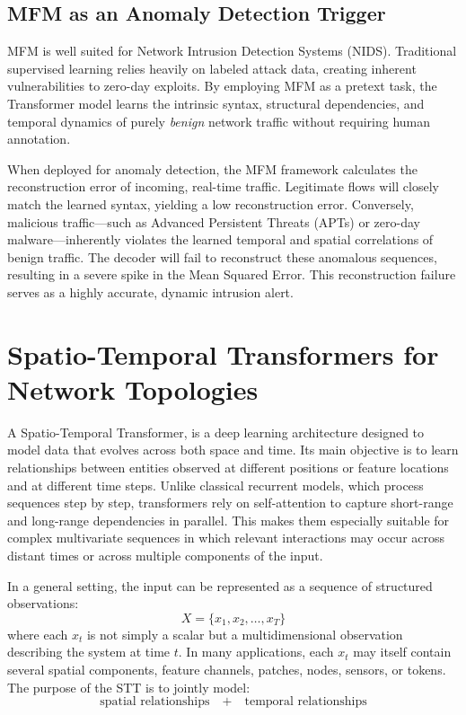 \documentclass[12pt, a4paper]{report}
\begin{document}
\subsection{MFM as an Anomaly Detection Trigger}
MFM is well suited for Network Intrusion Detection Systems (NIDS). Traditional supervised learning relies heavily on labeled attack data, creating inherent vulnerabilities to zero-day exploits. By employing MFM as a pretext task, the Transformer model learns the intrinsic syntax, structural dependencies, and temporal dynamics of purely \textit{benign} network traffic without requiring human annotation.

When deployed for anomaly detection, the MFM framework calculates the reconstruction error of incoming, real-time traffic. Legitimate flows will closely match the learned syntax, yielding a low reconstruction error. Conversely, malicious traffic—such as Advanced Persistent Threats (APTs) or zero-day malware—inherently violates the learned temporal and spatial correlations of benign traffic. The decoder will fail to reconstruct these anomalous sequences, resulting in a severe spike in the Mean Squared Error. This reconstruction failure serves as a highly accurate, dynamic intrusion alert.


\section{Spatio-Temporal Transformers for Network Topologies}


A Spatio-Temporal Transformer, is a deep learning architecture designed to model data that evolves across both space and time. Its main objective is to learn relationships between entities observed at different positions or feature locations and at different time steps. Unlike classical recurrent models, which process sequences step by step, transformers rely on self-attention to capture short-range and long-range dependencies in parallel. This makes them especially suitable for complex multivariate sequences in which relevant interactions may occur across distant times or across multiple components of the input.

In a general setting, the input can be represented as a sequence of structured observations:
$$
X = \{x_1, x_2, \dots, x_T\}
$$
where each $x_t$ is not simply a scalar but a multidimensional observation describing the system at time $t$. In many applications, each $x_t$ may itself contain several spatial components, feature channels, patches, nodes, sensors, or tokens. The purpose of the STT is to jointly model:
$$
\text{spatial relationships} \quad+\quad \text{temporal relationships}
$$
\end{document}
